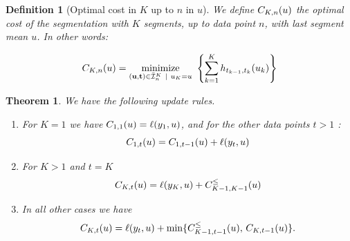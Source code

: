 \documentclass{article}
\newtheorem{theorem}{Theorem}
\newtheorem{definition}{Definition}
\DeclareMathOperator*{\minimize}{minimize}
\begin{document}


\begin{definition}[Optimal cost in $K$ up to $n$ in $u$]
\label{def:fcc}
  We define $C_{K,n}(u)$ the optimal cost of the segmentation
  with $K$ segments, up to data point $n$, with last segment mean
  $u$. In other words:

\begin{equation}
\FCC_{K,n}(u) = \minimize_{(\mathbf u, \mathbf t)\in\bar{\mathcal I}_n^K \ | \ u_K = u} \
  \left\{ \sum_{k=1}^K
  h_{t_{k-1}, t_k}(u_k) \right\}
\end{equation}
\end{definition}



\begin{theorem}
We have the following update rules.
\begin{enumerate}
\item For $K=1$ we have
$C_{1,1}(u)=\ell(y_1,u)$, and for the other data
  points $t>1$ :
\begin{equation}
C_{1,t}(u)=C_{1,t-1}(u)+\ell(y_t,u)
\end{equation}

\item For $K>1$ and $t=K$
\begin{equation}
  C_{K,t}(u)=\ell(y_K, u)+C_{K-1,K-1}^\leq(u)
\end{equation}
\item In all other cases we have
  \begin{equation}
  C_{K,t}(u)=\ell(y_t,u)+
  \min\{
  C_{K-1,t-1}^\leq(u),\,
  C_{K,t-1}(u)
  \}.
  \end{equation}
\end{enumerate}
\end{theorem}
\end{document}
